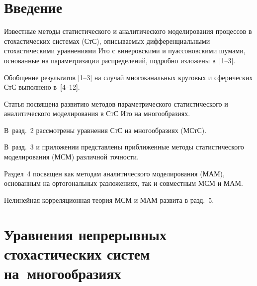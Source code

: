       \begin{multicols}{2}

            \label{st\stat}

\section{Введение}

Известные методы статистического и аналитического моделирования процессов в стохастических системах (СтС), 
описываемых дифференциальными стохастическими уравнениями Ито с винеров\-скими и пуассоновскими шумами, основанные 
на параметризации распределений, подробно изложены в~[1--3].

Обобщение результатов [1--3] на случай многоканальных круговых и сферических СтС выполнено в~[4--12].

Статья посвящена развитию методов параметрического статистического и аналитического моделирования 
в СтС Ито на многообразиях. 

В~разд.~2 рассмотрены уравнения СтС на многообразиях (МСтС). 

В~разд.~3 и приложении представлены приближенные методы статистического моделирования (МСМ) различной точности. 

Раздел~4 посвящен как методам аналитического моделирования (МАМ), основанным на ортогональных разложениях, так 
 и совместным МСМ и МАМ. 
 
 Нелинейная корреляционная теория МСМ и  МАМ развита в разд.~5.

\section{Уравнения непрерывных стохастических систем на~многообразиях}


\end{multicols}
